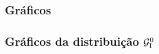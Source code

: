 \subsubsection{Gráficos}
\begin{frame}
\frametitle{Gráficos da distribuição $\mathcal{G}_{\rm I}^{0}$}

\end{frame}

